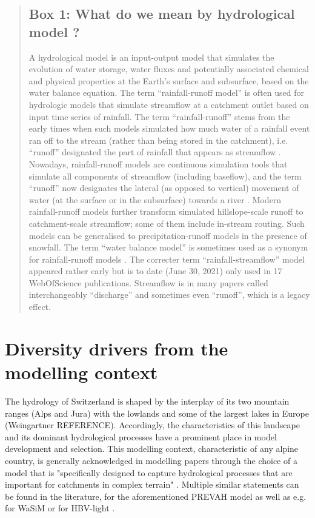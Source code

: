 \documentclass[10pt,a4paper]{article}
\begin{document}
\begin{quote}
\subsection*{Box 1: What do we mean by hydrological model ?}
\label{box:1}

A hydrological model is an input-output model that simulates the evolution of water storage, water fluxes and potentially associated chemical and physical properties at the Earth's surface and subsurface, based on the water balance equation. The term ``rainfall-runoff model'' is often used for hydrologic models that simulate streamflow at a catchment outlet based on input time series of rainfall. The term ``rainfall-runoff'' stems from the early times when such models simulated how much water of a rainfall event ran off to the stream (rather than being stored in the catchment), i.e. ``runoff'' designated the part of rainfall that appears as streamflow \citep{WMO1992}. Nowadays, rainfall-runoff models are continuous simulation tools that simulate all components of streamflow (including baseflow), and the term ``runoff'' now designates the lateral (as opposed to vertical) movement of water (at the surface or in the subsurface) towards a river \citep{WMO2012}. Modern rainfall-runoff models further transform simulated hillslope-scale runoff to catchment-scale streamflow; some of them include in-stream routing. Such models can be generalised to precipitation-runoff models in the presence of snowfall. The term ``water balance model'' is sometimes used as a synonym for rainfall-runoff models \citep{Boughton2004}. The correcter term ``rainfall-streamflow'' model appeared rather early \citep{Young1991} but is to date (June 30, 2021) only used in 17 WebOfScience publications. Streamflow is in many papers called interchangeably ``discharge'' and sometimes even ``runoff'', which is a legacy effect.  \end{quote}


\section{Diversity drivers from the modelling context}
\label{sec:context}

The hydrology of Switzerland is shaped by the interplay of its two mountain ranges (Alps and Jura) with the lowlands and some of the largest lakes in Europe (Weingartner REFERENCE). Accordingly, the characteristics of this landscape and its dominant hydrological processes have a prominent place in model development and selection. This modelling context, characteristic of any alpine country, is generally acknowledged in modelling papers through the choice of a model that is "specifically designed to capture hydrological processes that are important for catchments in complex terrain" \citep[][refering to the PREVAH model]{Anghileri2019}. Multiple similar statements can be found in the literature, for the aforementioned PREVAH model \citep{Verbunt2007, Zappa2007a, Koplin2010,  Brunner2019e} as well as e.g. for WaSiM \citep{Jasper2002, Jasper2003, Thornton2021} or for HBV-light \citep{SikorskaSenoner2020}. 
\end{document}
